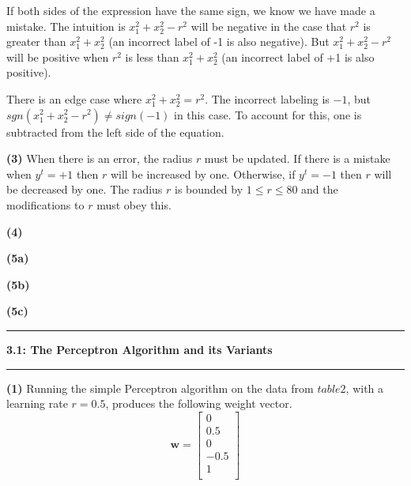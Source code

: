 \documentclass[11pt]{article}
\newcommand\question[2]{\vspace{.25in}\hrule\textbf{#1: #2}\vspace{.5em}\hrule\vspace{.10in}}
\renewcommand\part[1]{\vspace{.10in}\textbf{(#1)}}
\begin{document}

If both sides of the expression have the same sign, we know we have made a mistake. The intuition is $x_1^2 + x_2^2 - r^2$ will be negative in the case that $r^2$ is greater than $x_1^2 + x_2^2$ (an incorrect label of -1 is also negative). But $x_1^2 + x_2^2 - r^2$ will be positive when $r^2$ is less than $x_1^2 + x_2^2$ (an incorrect label of +1 is also positive). 

There is an edge case where $x_1^2 + x_2^2 = r^2$. The incorrect labeling is $-1$, but $sgn(x_1^2 + x_2^2 - r^2) \neq sign(-1)$ in this case. To account for this, one is subtracted from the left side of the equation. 

\part{3} When there is an error, the radius $r$ must be updated. If there is a mistake when $y^t = +1$ then $r$ will be increased by one. Otherwise, if $y^t = -1$ then $r$ will be decreased by one. The radius $r$ is bounded by $1 \leq r \leq 80$ and the modifications to $r$ must obey this. 



\part{4}

\part{5a}

\part{5b}

\part{5c}

\question{3.1}{The Perceptron Algorithm and its Variants}

\part{1} Running the simple Perceptron algorithm on the data from $table2$, with a learning rate $r = 0.5$, produces the following weight vector.
$$\mathbf{w} = \begin{bmatrix}
    0\\
    0.5\\
    0\\
    -0.5\\
    1\\
\end{bmatrix}$$
\end{document}
